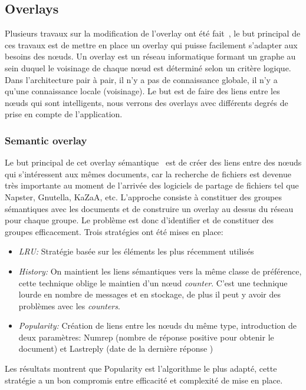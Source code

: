 	\subsection{Overlays}
	Plusieurs travaux sur la modification de l'overlay ont été fait~\cite{999375,10.1109/SRDS.2006.33,citeulike:6040284}, le but principal de ces travaux est de mettre en place un overlay qui puisse facilement s'adapter aux besoins des nœuds. Un overlay est un réseau informatique formant un graphe au sein duquel le voisinage de chaque nœud est déterminé selon un critère logique. Dans l'architecture pair à pair, il n'y a pas de connaissance globale, il n'y a qu'une connaissance locale (voisinage). Le but est de faire des liens entre les nœuds qui sont intelligents, nous verrons des overlays avec différents degrés de prise en compte de l'application. 
		\subsubsection{Semantic overlay}
			Le but principal de cet overlay sémantique~\cite{999375} est de créer des liens entre des nœuds qui s'intéressent aux mêmes documents, car la recherche de fichiers est devenue très importante au moment de l'arrivée des logiciels de partage de fichiers tel que Napster, Gnutella, KaZaA, etc. L'approche consiste à constituer des groupes sémantiques avec les documents et de construire un overlay au dessus du réseau pour chaque groupe. Le problème est donc d'identifier et de constituer des groupes efficacement. Trois stratégies ont été mises en place:
		\begin{itemize}
		\renewcommand{\labelitemi}{$\bullet$}
                	\item \textit{LRU:} Stratégie basée sur les éléments les plus récemment utilisés
                	\item \textit{History:} On maintient les liens sémantiques vers la même classe de préférence, cette technique oblige le maintien d'un nœud \textit{counter}. C'est une technique lourde en nombre de messages et en stockage, de plus il peut y avoir des problèmes avec les \textit{counters}.
	                \item \textit{Popularity:} Création de liens entre les nœuds du même type, introduction de deux paramètres: Numrep (nombre de réponse positive pour obtenir le document) et Lastreply (date de la dernière réponse )
        	\end{itemize}
	        Les résultats montrent que Popularity est l'algorithme le plus adapté, cette stratégie a un bon compromis entre efficacité et complexité de mise en place.

